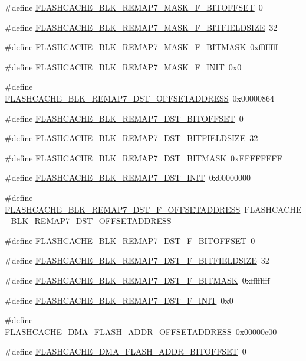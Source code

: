 \begin{DoxyCompactItemize}
\#define \hyperlink{a00550_ab6d64601e8cf46fcdc443d6e74d8b2e1}{FLASHCACHE\_\-BLK\_\-REMAP7\_\-MASK\_\-F\_\-BITOFFSET}~0
\item 
\#define \hyperlink{a00550_a70b5f6c3804b1a45d495853a47a14b56}{FLASHCACHE\_\-BLK\_\-REMAP7\_\-MASK\_\-F\_\-BITFIELDSIZE}~32
\item 
\#define \hyperlink{a00550_a6de173a9464c99b965a04c722bd9c50f}{FLASHCACHE\_\-BLK\_\-REMAP7\_\-MASK\_\-F\_\-BITMASK}~0xffffffff
\item 
\#define \hyperlink{a00550_ac63b2adbe03f4b85cad3f28302604233}{FLASHCACHE\_\-BLK\_\-REMAP7\_\-MASK\_\-F\_\-INIT}~0x0
\item 
\#define \hyperlink{a00550_a39cee1d1b741f82326ab58f2df2a01c6}{FLASHCACHE\_\-BLK\_\-REMAP7\_\-DST\_\-OFFSETADDRESS}~0x00000864
\item 
\#define \hyperlink{a00550_ac11bed1c3fb357503ed6e6ac5cdee1cb}{FLASHCACHE\_\-BLK\_\-REMAP7\_\-DST\_\-BITOFFSET}~0
\item 
\#define \hyperlink{a00550_a9ff60d608488ed8563123f31296f6c8a}{FLASHCACHE\_\-BLK\_\-REMAP7\_\-DST\_\-BITFIELDSIZE}~32
\item 
\#define \hyperlink{a00550_a55e7f2f60f7b2bd8292dc45d2e0210ad}{FLASHCACHE\_\-BLK\_\-REMAP7\_\-DST\_\-BITMASK}~0xFFFFFFFF
\item 
\#define \hyperlink{a00550_af17eedacf300e2ce181884556a1867fa}{FLASHCACHE\_\-BLK\_\-REMAP7\_\-DST\_\-INIT}~0x00000000
\item 
\#define \hyperlink{a00550_a1b4ba36497d7d537faf0ff02ac23d9d4}{FLASHCACHE\_\-BLK\_\-REMAP7\_\-DST\_\-F\_\-OFFSETADDRESS}~FLASHCACHE\_\-BLK\_\-REMAP7\_\-DST\_\-OFFSETADDRESS
\item 
\#define \hyperlink{a00550_af693ec986d28f8e3ab130930773a36e3}{FLASHCACHE\_\-BLK\_\-REMAP7\_\-DST\_\-F\_\-BITOFFSET}~0
\item 
\#define \hyperlink{a00550_aade64f9fadf36f2f066ce4d21c143fc9}{FLASHCACHE\_\-BLK\_\-REMAP7\_\-DST\_\-F\_\-BITFIELDSIZE}~32
\item 
\#define \hyperlink{a00550_a344e3242a9c1c05d1e9474ab4b1a263a}{FLASHCACHE\_\-BLK\_\-REMAP7\_\-DST\_\-F\_\-BITMASK}~0xffffffff
\item 
\#define \hyperlink{a00550_afe6e315ca2581519f771004f81ccdb86}{FLASHCACHE\_\-BLK\_\-REMAP7\_\-DST\_\-F\_\-INIT}~0x0
\item 
\#define \hyperlink{a00550_af7ca26f805f0a1e08c949a286b519ab6}{FLASHCACHE\_\-DMA\_\-FLASH\_\-ADDR\_\-OFFSETADDRESS}~0x00000c00
\item 
\#define \hyperlink{a00550_a6c627e4ca755339580e06602e2e5b424}{FLASHCACHE\_\-DMA\_\-FLASH\_\-ADDR\_\-BITOFFSET}~0

\end{DoxyCompactItemize}
